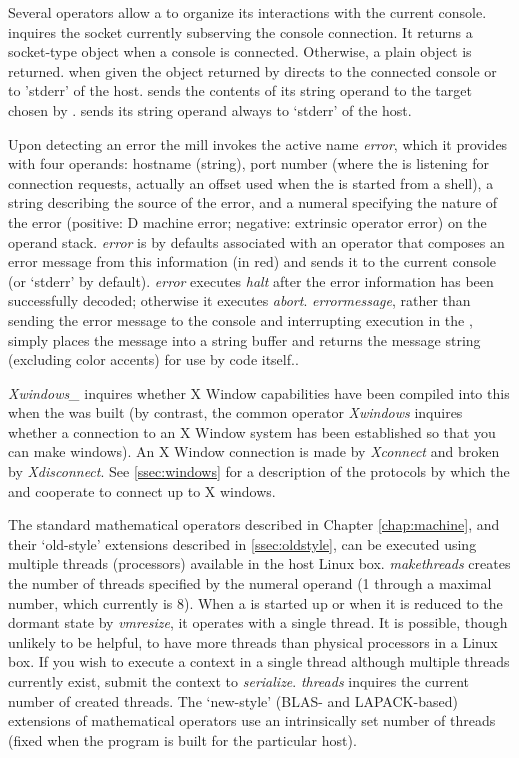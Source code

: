 Several operators allow a  to organize its interactions
with the current console.  inquires the socket currently
subserving the console connection. It returns a socket-type
 object when a console is connected. Otherwise, a plain
 object is returned.  when given the
object returned by  directs  to the
connected console or to 'stderr' of the 
host.  sends the contents of its string operand to the
target chosen by .  sends its string
operand always to `stderr' of the host.

Upon detecting an error the  mill invokes the active name
\emph{error}, which it provides with four operands: hostname (string),
port number (where the  is listening for connection
requests, actually an offset used when the  is started
from a shell), a string describing the source of the error, and a
numeral specifying the nature of the error (positive: D machine error;
negative: extrinsic operator error) on the operand stack. \emph{error}
is by defaults associated with an operator that composes an error
message from this information (in red) and sends it to the current
console (or `stderr' by default). \emph{error} executes \emph{halt}
after the error information has been successfully decoded; otherwise
it executes \emph{abort}. \emph{errormessage}, rather than sending the
error message to the console and interrupting execution in the
, simply places the message into a string buffer and
returns the message string (excluding color accents) for use by
 code itself..

\emph{Xwindows\_} inquires whether X Window capabilities have been
compiled into this  when the  was built (by
contrast, the common operator \emph{Xwindows} inquires whether a
connection to an X Window system has been established so that you can
make windows). An X Window connection is made by \emph{Xconnect} and
broken by \emph{Xdisconnect}. See \ref{ssec:windows} for a description
of the protocols by which the  and  cooperate
to connect up to X windows.

The standard mathematical operators described in Chapter
\ref{chap:machine}, and their `old-style' extensions described in
\ref{ssec:oldstyle}, can be executed using multiple threads
(processors) available in the host Linux box. \emph{makethreads}
creates the number of threads specified by the numeral operand (1
through a maximal number, which currently is 8). When a 
is started up or when it is reduced to the dormant state by
\emph{vmresize}, it operates with a single thread. It is possible,
though unlikely to be helpful, to have more threads than physical
processors in a Linux box. If you wish to execute a context in a
single thread although multiple threads currently exist, submit the
context to \emph{serialize}. \emph{threads} inquires the current
number of created threads. The `new-style' (BLAS- and LAPACK-based)
extensions of mathematical operators use an intrinsically set number
of threads (fixed when the  program is built for the
particular host).

